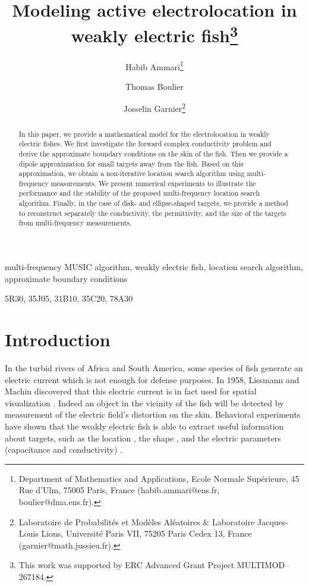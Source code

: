 \documentclass[final]{siamltex}
\title{Modeling active electrolocation in weakly electric fish\thanks{\footnotesize This work
was supported  by ERC Advanced Grant Project MULTIMOD--267184.}}
\author{Habib Ammari\thanks{\footnotesize Department of Mathematics and Applications,
Ecole Normale Sup\'erieure, 45 Rue d'Ulm, 75005 Paris, France
(habib.ammari@ens.fr, boulier@dma.ens.fr).} \and Thomas
Boulier\footnotemark[2] \and Josselin Garnier\thanks{\footnotesize
Laboratoire de Probabilit\'es et Mod\`eles Al\'eatoires \&
Laboratoire Jacques-Louis Lions, Universit\'e Paris VII, 75205
Paris Cedex 13, France (garnier@math.jussieu.fr).}}
\numberwithin{equation}{section}
\numberwithin{figure}{section}
\numberwithin{table}{section}
\begin{document}
\maketitle
\begin{abstract}
In this paper, we provide a mathematical model for the
electrolocation in weakly electric fishes. We first investigate
the forward complex conductivity problem and derive the
approximate boundary conditions on the skin of the fish. Then we
provide a dipole approximation for small targets away from the
fish. Based on this approximation, we obtain a non-iterative
location search algorithm using multi-frequency measurements. We
present numerical experiments to illustrate the performance and
the stability of the proposed multi-frequency location search
algorithm. Finally, in the case of disk- and ellipse-shaped
targets, we provide a method to reconstruct separately the
conductivity, the permittivity, and the size of the targets from
multi-frequency measurements.
\end{abstract}


\begin{keywords} multi-frequency MUSIC
algorithm, weakly electric fish, location search algorithm,
approximate boundary conditions\end{keywords}

\begin{AMS} 5R30,
35J05, 31B10, 35C20, 78A30 \end{AMS}

\pagestyle{myheadings} \thispagestyle{plain} 


\section{Introduction}

In the turbid rivers of Africa and South America, some species of
fish generate an electric current which is not enough for defense
purposes. In 1958, Lissmann and Machin discovered that this
electric current is in fact used for spatial visualization
\cite{lissmann1958mechanism}. Indeed an object in the vicinity of
the fish will be detected by measurement of the electric field's
distortion on the skin. Behavioral experiments have shown that the
weakly electric fish is able to extract useful information about
targets, such as the location \cite{von1993electric}, the shape
\cite{von2007distance}, and the electric parameters (capacitance
and conductivity) \cite{von1999active}.
\end{document}
